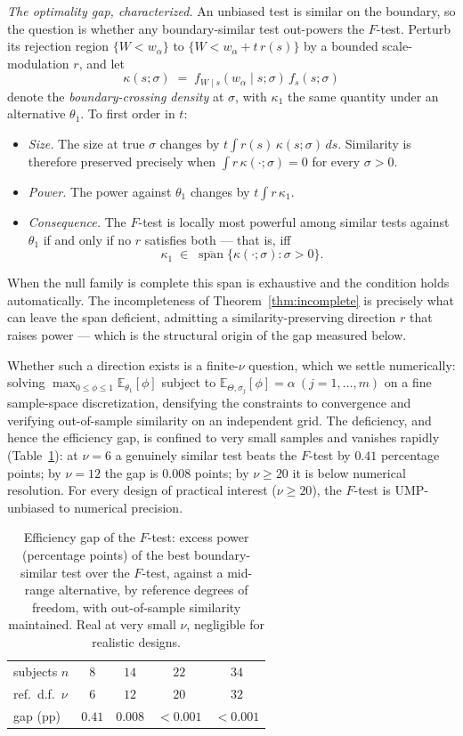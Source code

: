 \documentclass[11pt]{article}
\theoremstyle{remark}
\newcommand{\E}{\mathbb{E}}
\begin{document}
\noindent\emph{The optimality gap, characterized.} An unbiased test is similar on the boundary, so the question is whether any boundary-similar test out-powers the $F$-test. Perturb its rejection region $\{W<w_\alpha\}$ to $\{W<w_\alpha+t\,r(s)\}$ by a bounded scale-modulation $r$, and let
\[
\kappa(s;\sigma)\;=\;f_{W\mid s}(w_\alpha\mid s;\sigma)\,f_s(s;\sigma)
\]
denote the \emph{boundary-crossing density} at $\sigma$, with $\kappa_1$ the same quantity under an alternative $\theta_1$. To first order in $t$:
\begin{itemize}
\item \emph{Size.} The size at true $\sigma$ changes by $t\!\int r(s)\,\kappa(s;\sigma)\,ds$. Similarity is therefore preserved precisely when
$\int r\,\kappa(\cdot;\sigma)=0$ for every $\sigma>0$.
\item \emph{Power.} The power against $\theta_1$ changes by $t\!\int r\,\kappa_1$.
\item \emph{Consequence.} The $F$-test is locally most powerful among similar tests against $\theta_1$ if and only if no $r$ satisfies both --- that is, iff
\[
\kappa_1 \;\in\; \overline{\operatorname{span}}\{\kappa(\cdot;\sigma):\sigma>0\}.
\]
\end{itemize}
When the null family is complete this span is exhaustive and the condition holds automatically. The incompleteness of Theorem~\ref{thm:incomplete} is precisely what can leave the span deficient, admitting a similarity-preserving direction $r$ that raises power --- which is the structural origin of the gap measured below.

Whether such a direction exists is a finite-$\nu$ question, which we settle numerically: solving $\max_{0\le\phi\le1}\E_{\theta_1}[\phi]$ subject to $\E_{\Theta,\sigma_j}[\phi]=\alpha\ (j=1,\dots,m)$ on a fine sample-space discretization, densifying the constraints to convergence and verifying out-of-sample similarity on an independent grid. The deficiency, and hence the efficiency gap, is confined to very small samples and vanishes rapidly (Table~\ref{tab:gap}): at $\nu=6$ a genuinely similar test beats the $F$-test by $0.41$ percentage points; by $\nu=12$ the gap is $0.008$ points; by $\nu\ge20$ it is below numerical resolution. For every design of practical interest ($\nu\ge20$), the $F$-test is UMP-unbiased to numerical precision.

\begin{table}[t]
\centering
\caption{Efficiency gap of the $F$-test: excess power (percentage points) of the best boundary-similar test over the $F$-test, against a mid-range alternative, by reference degrees of freedom, with out-of-sample similarity maintained. Real at very small $\nu$, negligible for realistic designs.}
\label{tab:gap}
\begin{tabular}{lcccc}
\toprule
subjects $n$ & $8$ & $14$ & $22$ & $34$ \\
ref.\ d.f.\ $\nu$ & $6$ & $12$ & $20$ & $32$ \\
gap (pp) & $0.41$ & $0.008$ & $<0.001$ & $<0.001$ \\
\bottomrule
\end{tabular}
\end{table}
\end{document}

